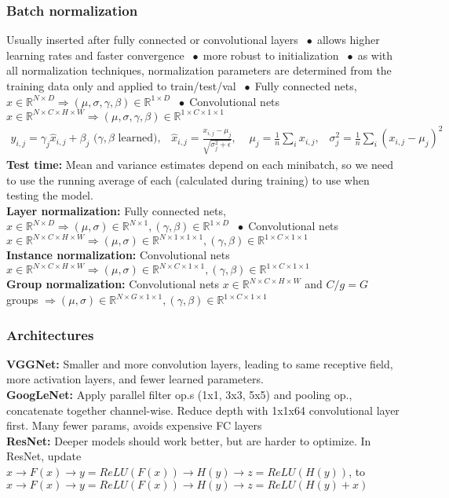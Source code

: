 \documentclass[9pt]{extarticle}
\newcommand*\bspace{$\; \bullet \;$}
\begin{document}
\subsubsection{Batch normalization}
Usually inserted after fully connected or convolutional layers \bspace allows higher learning rates and faster convergence \bspace more robust to initialization \bspace as with all normalization techniques, normalization parameters are determined from the training data only and applied to train/test/val  \bspace Fully connected nets, $x \in \mathbb{R}^{N\times D} \Longrightarrow (\mu, \sigma, \gamma, \beta) \in \mathbb{R}^{1\times D}$ \bspace Convolutional nets $x \in \mathbb{R}^{N\times C\times H\times W} \Longrightarrow (\mu, \sigma, \gamma, \beta) \in \mathbb{R}^{1\times C\times 1\times 1}$
\begin{align*}
    y_{i,j} = \gamma_j\hat{x}_{i,j} + \beta_j \textrm{ ($\gamma,\beta$ learned)}, \;\;\; \hat{x}_{i,j} = \frac{x_{i,j} - \mu_j}{\sqrt{\sigma_j^2 + \epsilon}}, \;\;\;\; \mu_j = \frac{1}{n}\sum_i x_{i,j}, \;\;\; \sigma_j^2 = \frac{1}{n}\sum_i(x_{i,j} - \mu_j)^2
\end{align*}
\textbf{Test time:} Mean and variance estimates depend on each minibatch, so we need to use the running average of each (calculated during training) to use when testing the model.\\
\textbf{Layer normalization:} Fully connected nets, $x \in \mathbb{R}^{N\times D} \Longrightarrow (\mu, \sigma) \in \mathbb{R}^{N\times 1}, (\gamma, \beta) \in \mathbb{R}^{1\times D}$ \bspace Convolutional nets $x \in \mathbb{R}^{N\times C\times H\times W} \Longrightarrow (\mu, \sigma) \in \mathbb{R}^{N\times 1\times 1\times 1}, (\gamma, \beta) \in \mathbb{R}^{1\times C\times 1\times 1}$\\
\textbf{Instance normalization:} Convolutional nets $x \in \mathbb{R}^{N\times C\times H\times W} \Longrightarrow (\mu, \sigma) \in \mathbb{R}^{N\times C\times 1\times 1}, (\gamma, \beta) \in \mathbb{R}^{1\times C\times 1\times 1}$\\
\textbf{Group normalization:} Convolutional nets $x \in \mathbb{R}^{N\times C\times H\times W}$ and $C / g = G$ groups $\Longrightarrow (\mu, \sigma) \in \mathbb{R}^{N\times G\times 1\times 1}, (\gamma, \beta) \in \mathbb{R}^{1\times C\times 1\times 1}$

\subsubsection{Architectures}
\textbf{VGGNet:} Smaller and more convolution layers, leading to same receptive field, more activation layers, and fewer learned parameters.\\
\textbf{GoogLeNet:} Apply parallel filter op.s (1x1, 3x3, 5x5) and pooling op., concatenate together channel-wise. Reduce depth with 1x1x64 convolutional layer first. Many fewer params, avoids expensive FC layers\\
\textbf{ResNet:} Deeper models should work better, but are harder to optimize. In ResNet, update $x \rightarrow F(x) \rightarrow y = ReLU(F(x)) \rightarrow H(y) \rightarrow z = ReLU(H(y))$, to $x \rightarrow F(x) \rightarrow y = ReLU(F(x)) \rightarrow H(y) \rightarrow z = ReLU(H(y) + x)$
\end{document}
